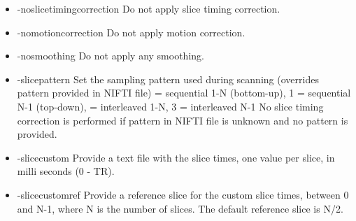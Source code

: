 \begin{itemize}

\item -noslicetimingcorrection
\newline \newline Do not apply slice timing correction. \newline

\item -nomotioncorrection
\newline \newline Do not apply motion correction. \newline

\item -nosmoothing
\newline \newline Do not apply any smoothing. \newline

\item -slicepattern
\newline \newline Set the sampling pattern used during scanning \newline
 				  (overrides pattern provided in NIFTI file)  = sequential 1-N (bottom-up), 1 = sequential N-1 (top-down),  = interleaved 1-N, 3 = interleaved N-1 \newline \newline
                  No slice timing correction is performed if pattern in \newline
                  NIFTI file is unknown and no pattern is provided. 

\item -slicecustom
\newline \newline Provide a text file with the slice times, \newline
				  one value per slice, in milli seconds (0 - TR). \newline

\item -slicecustomref
\newline \newline Provide a reference slice for the custom slice times, \newline
				  between 0 and N-1, where N is the number of slices. \newline
				  The default reference slice is N/2.
 


\end{itemize}
